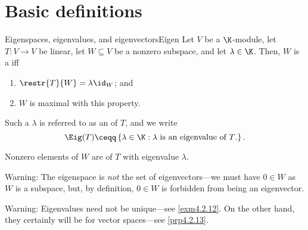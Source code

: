 \section{Basic definitions}

\begin{dfn}{Eigenspaces, eigenvalues, and eigenvectors}{Eigen}
	Let $V$ be a $\K$-module, let $T\colon V\rightarrow V$ be linear, let $W\subseteq V$ be a nonzero subspace, and let $\lambda \in \K$.  Then, $W$ is a  iff
	\begin{enumerate}
		\item \label{Eigen(i)}$\restr{T}{W}=\lambda \id _W$; and
		\item \label{Eigen(ii)}$W$ is maximal with this property.
	\end{enumerate}
	\begin{rmk}
		Such a $\lambda$ is referred to as an  of $T$, and we write
		\begin{equation}
			\Eig (T)\ceqq \left\{ \lambda \in \K :\lambda \text{ is an eigenvalue of }T\text{.}\right\} .
		\end{equation}
	\end{rmk}
	\begin{rmk}
		Nonzero elements of $W$ are  of $T$ with eigenvalue $\lambda$.
	\end{rmk}
	\begin{rmk}
		Warning:  The eigenspace is \emph{not} the set of eigenvectors---we must have $0\in W$ as $W$ is a subspace, but, by definition, $0\in W$ is forbidden from being an eigenvector.
	\end{rmk}
	\begin{rmk}
		Warning:  Eigenvalues need not be unique---see \cref{exm4.2.12}.  On the other hand, they certainly will be for vector spaces---see \cref{prp4.2.13}.
		

\end{rmk}
\end{dfn}
